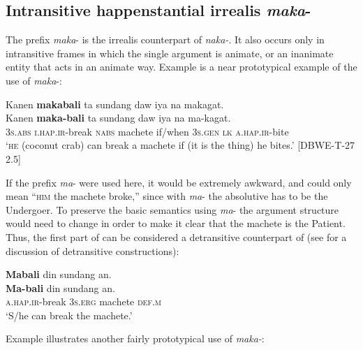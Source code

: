\subsection{Intransitive happenstantial irrealis \textit{maka}{}-}
\label{bkm:Ref122761448}\label{sec:intransitivehappenstantialirrealis}

The prefix \textit{maka}{}- is the irrealis counterpart of \textit{naka-}. It also occurs only in intransitive frames in which the single argument is animate, or an inanimate entity that acts in an animate way. Example  is a near prototypical example of the use of \textit{maka}{}-:

\ea
\label{bkm:Ref447962976}
Kanen  \textbf{makabali}  ta  sundang  daw  iya  na  makagat. \\\smallskip
 \gll Kanen  \textbf{maka-bali}  ta  sundang  daw  iya  na  ma-kagat. \\
3\textsc{s.abs}  \textsc{i.hap.ir}-break  \textsc{nabs}  machete  if/when  3\textsc{s.gen}  \textsc{lk}  \textsc{a.hap.ir}-bite \\
\glt ‘\textsc{he} (coconut crab) can break a machete if (it is the thing) he bites.’ [DBWE-T-27 2.5]
\z

If the prefix \textit{ma}{}- were used here, it would be extremely awkward, and could only mean “\textsc{him} the machete broke,” since with \textit{ma}{}- the absolutive has to be the Undergoer. To preserve the basic semantics using \textit{ma}{}- the argument structure would need to change in order to make it clear that the machete is the Patient. Thus, the first part of  can be considered a detransitive counterpart of  (see  for a discussion of detransitive constructions):

\ea
\label{bkm:Ref447963964}
\textbf{Mabali}  din  sundang  an. \\\smallskip
 \gll \textbf{Ma-bali}  din  sundang  an. \\
\textsc{a.hap.ir}-break  3\textsc{s.erg} machete  \textsc{def.m} \\
\glt ‘S/he can break the machete.’
\z

Example  illustrates another fairly prototypical use of \textit{maka-}:

